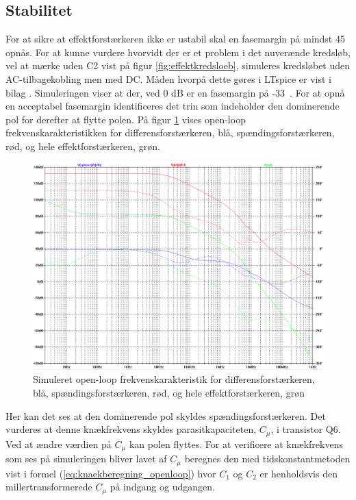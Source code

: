\subsection{Stabilitet}
\label{effektforstaerker-stabilitet}

For at sikre at effektforstærkeren ikke er ustabil skal en fasemargin på mindst 45\degree~ opnås. For at kunne vurdere hvorvidt der er et problem i det nuverænde kredsløb, vel at mærke uden C2 vist på figur \ref{fig:effektkredsloeb}, simuleres kredsløbet uden AC-tilbagekobling men med DC. Måden hvorpå dette gøres i LTspice er vist i bilag \cite{effektforstaerker-openloop-simulering}%
. Simuleringen viser at der, ved 0 dB er en fasemargin på -33\degree~. For at opnå en acceptabel fasemargin identificeres det trin som indeholder den dominerende pol for derefter at flytte polen. På figur \ref{fig:frek_openloop_ukorigeret} vises open-loop frekvenskarakteristikken for differensforstærkeren, blå, spændingsforstærkeren, rød, og hele effektforstærkeren, grøn. 


\begin{figure}[h]
\centering
\includegraphics[width=\textwidth]{teknisk/effektforstaerker/frek_ukorrigeret_stabilitet.png}
\caption{Simuleret open-loop frekvenskarakteristik for differensforstærkeren, blå, spændingsforstærkeren, rød, og hele effektforstærkeren, grøn}
\label{fig:frek_openloop_ukorigeret}
\end{figure}

Her kan det ses at den dominerende pol skyldes spændingsforstærkeren. Det vurderes at denne knækfrekvens skyldes parasitkapaciteten, $C_\mu$, i transistor Q6. Ved at ændre værdien på $C_\mu$ kan polen flyttes. For at verificere at knækfrekvens som ses på simuleringen bliver lavet af $C_\mu$ beregnes den med tidskonstantmetoden vist i formel (\ref{eq:knaekberegning_openloop}) \cite{tidskonstantmetoden} %
hvor $C_1$ og $C_2$ er henholdsvis den millertransformerede $C_\mu$ på indgang og udgangen.


